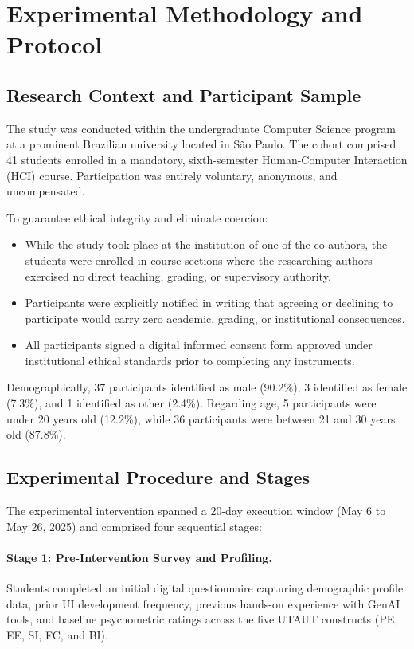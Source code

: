 \documentclass{cleiej}
\begin{document}
\section{Experimental Methodology and Protocol}
\label{sec:method}

\subsection{Research Context and Participant Sample}
The study was conducted within the undergraduate Computer Science program at a prominent Brazilian university located in S\~{a}o Paulo. The cohort comprised 41 students enrolled in a mandatory, sixth-semester Human-Computer Interaction (HCI) course. Participation was entirely voluntary, anonymous, and uncompensated.

To guarantee ethical integrity and eliminate coercion:
\begin{itemize}[leftmargin=*]
    \item While the study took place at the institution of one of the co-authors, the students were enrolled in course sections where the researching authors exercised no direct teaching, grading, or supervisory authority.
    \item Participants were explicitly notified in writing that agreeing or declining to participate would carry zero academic, grading, or institutional consequences.
    \item All participants signed a digital informed consent form approved under institutional ethical standards prior to completing any instruments.
\end{itemize}

Demographically, 37 participants identified as male (90.2\%), 3 identified as female (7.3\%), and 1 identified as other (2.4\%). Regarding age, 5 participants were under 20 years old (12.2\%), while 36 participants were between 21 and 30 years old (87.8\%). 

\subsection{Experimental Procedure and Stages}
The experimental intervention spanned a 20-day execution window (May 6 to May 26, 2025) and comprised four sequential stages:

\paragraph{Stage 1: Pre-Intervention Survey and Profiling.} 
Students completed an initial digital questionnaire capturing demographic profile data, prior UI development frequency, previous hands-on experience with GenAI tools, and baseline psychometric ratings across the five UTAUT constructs (PE, EE, SI, FC, and BI).
\end{document}

